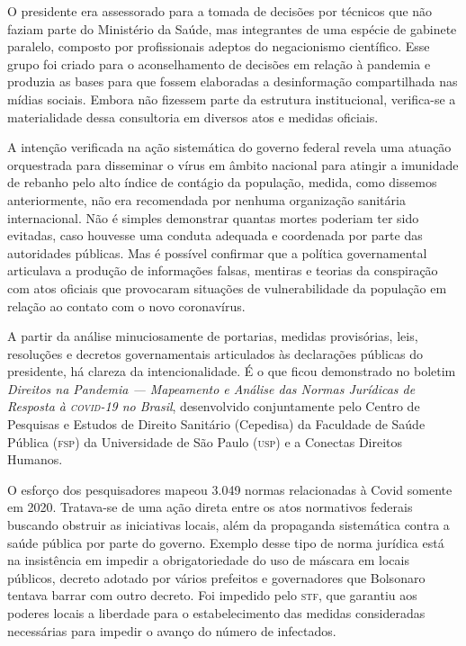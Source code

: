 O presidente era assessorado para a tomada de decisões por técnicos que
não faziam parte do Ministério da Saúde, mas integrantes de uma espécie
de gabinete paralelo, composto por profissionais adeptos do negacionismo
científico. Esse grupo foi criado para o aconselhamento de decisões em
relação à pandemia e produzia as bases para que fossem elaboradas a
desinformação compartilhada nas mídias sociais. Embora não fizessem
parte da estrutura institucional, verifica-se a materialidade dessa
consultoria em diversos atos e medidas oficiais.

A intenção verificada na ação sistemática do governo federal revela uma
atuação orquestrada para disseminar o vírus em âmbito nacional para
atingir a imunidade de rebanho pelo alto índice de contágio da
população, medida, como dissemos anteriormente, não era recomendada por
nenhuma organização sanitária internacional. Não é simples demonstrar
quantas mortes poderiam ter sido evitadas, caso houvesse uma conduta
adequada e coordenada por parte das autoridades públicas. Mas é possível
confirmar que a política governamental articulava a produção de
informações falsas, mentiras e teorias da conspiração com atos oficiais
que provocaram situações de vulnerabilidade da população em relação ao
contato com o novo coronavírus.

A partir da análise minuciosamente de portarias, medidas provisórias,
leis, resoluções e decretos governamentais articulados às declarações
públicas do presidente, há clareza da intencionalidade. É o que ficou
demonstrado no boletim \textit{Direitos na Pandemia --- Mapeamento e Análise das
Normas Jurídicas de Resposta à \textsc{covid-19} no Brasil}, desenvolvido
conjuntamente pelo Centro de Pesquisas e Estudos de Direito Sanitário
(Cepedisa) da Faculdade de Saúde Pública (\textsc{fsp}) da Universidade de São
Paulo (\textsc{usp}) e a Conectas Direitos Humanos.

O esforço dos pesquisadores mapeou 3.049 normas relacionadas à Covid
somente em 2020. Tratava-se de uma ação direta entre os atos normativos
federais buscando obstruir as iniciativas locais, além da propaganda
sistemática contra a saúde pública por parte do governo. Exemplo desse
tipo de norma jurídica está na insistência em impedir a obrigatoriedade
do uso de máscara em locais públicos, decreto adotado por vários
prefeitos e governadores que Bolsonaro tentava barrar com outro decreto.
Foi impedido pelo \textsc{stf}, que garantiu aos poderes locais a liberdade para
o estabelecimento das medidas consideradas necessárias para impedir o
avanço do número de infectados.

